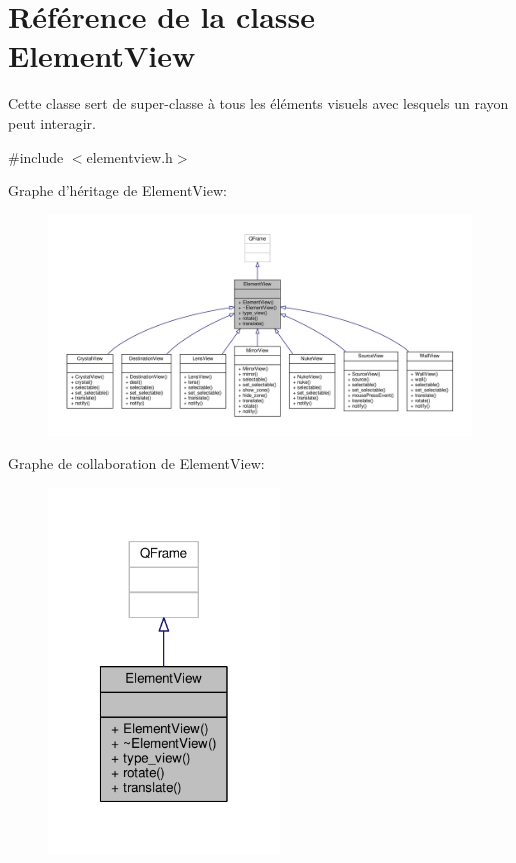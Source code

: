 \hypertarget{classElementView}{\section{Référence de la classe Element\+View}
\label{classElementView}
}


Cette classe sert de super-\/classe à tous les éléments visuels avec lesquels un rayon peut interagir.  




{\ttfamily \#include $<$elementview.\+h$>$}



Graphe d'héritage de Element\+View\+:
\nopagebreak
\begin{figure}[H]
\begin{center}
\leavevmode
\includegraphics[width=350pt]{d8/d16/classElementView__inherit__graph}
\end{center}
\end{figure}


Graphe de collaboration de Element\+View\+:
\nopagebreak
\begin{figure}[H]
\begin{center}
\leavevmode
\includegraphics[width=174pt]{d3/d60/classElementView__coll__graph}
\end{center}
\end{figure}
